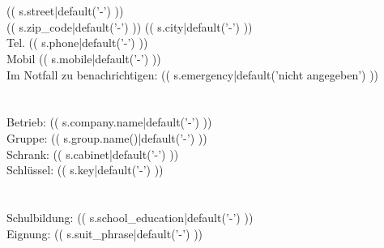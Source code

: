 \documentclass[a5paper, oneside, landscape]{scrartcl}
\begin{document}
\begin{minipage}{13cm}
\section*{}
(( s.street|default('-') ))\\
(( s.zip_code|default('-') )) (( s.city|default('-') ))\\
Tel. (( s.phone|default('-') ))\\
Mobil (( s.mobile|default('-') ))\\
Im Notfall zu benachrichtigen: (( s.emergency|default('nicht angegeben') ))

\section*{}
Betrieb: (( s.company.name|default('-') ))\\
Gruppe: (( s.group.name()|default('-') ))\\
Schrank: (( s.cabinet|default('-') ))\\
Schlüssel: (( s.key|default('-') ))

\section*{}
Schulbildung: (( s.school_education|default('-') ))\\
Eignung: (( s.suit_phrase|default('-') ))

\end{minipage}
\begin{minipage}{1cm}
\end{minipage}
\begin{minipage}[u]{4cm}

\end{minipage}
\end{document}
